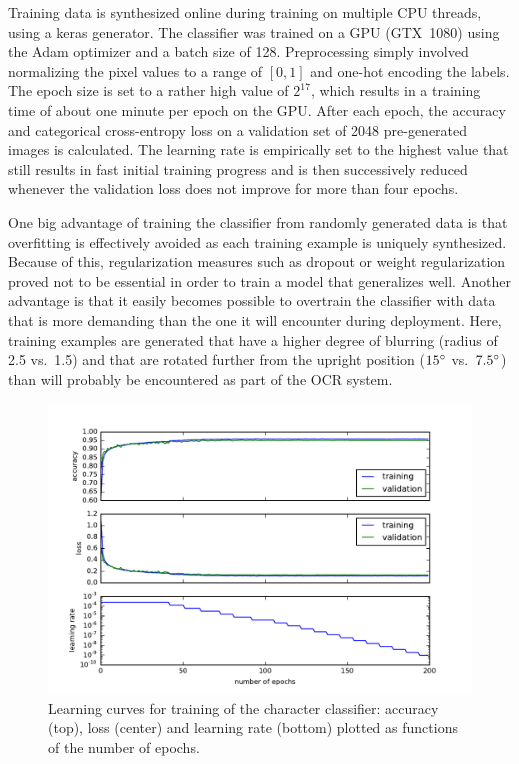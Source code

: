 \documentclass[11pt]{article}
\begin{document}
Training data is synthesized online during training on multiple CPU threads, using a keras generator. The classifier was trained
on a GPU (GTX~1080) using the Adam optimizer \cite{Kingma2014} and a batch size of 128.
Preprocessing simply involved normalizing the pixel values to a range of $[0, 1]$ and one-hot encoding
the labels. The epoch size is set to a rather high value of $2^{17}$,
which results in a training time of about one minute per epoch on the GPU.
After each epoch, the accuracy and categorical cross-entropy loss on a validation set of
2048 pre-generated images is calculated.
The learning rate is empirically set to the highest value that still results in fast initial training progress and is then
successively reduced whenever the validation loss does not improve for more than four epochs.

One big advantage of training the classifier from randomly generated data is that overfitting
is effectively avoided as each training example is uniquely synthesized. Because of this,
regularization measures such as dropout \cite{Srivastava2014} or weight regularization proved not to be essential
in order to train a model that generalizes well. Another advantage is that it easily becomes
possible to overtrain the classifier with data that is more demanding than the one it will
encounter during deployment. Here, training examples are generated that have a higher degree
of blurring (radius of 2.5 vs.~1.5) and that are rotated further from the upright position
($15\degree$ vs.~$7.5\degree$)
than will probably be encountered as part of the OCR system.

%

\begin{figure}[ht]
  \centering
  \includegraphics{fig/learning_curve}
  \caption{
    Learning curves for training of the character classifier:
    accuracy (top), loss (center) and learning rate (bottom) plotted as functions of
    the number of epochs.
    \label{fig:learning_curve}
  }
\end{figure}
\end{document}

